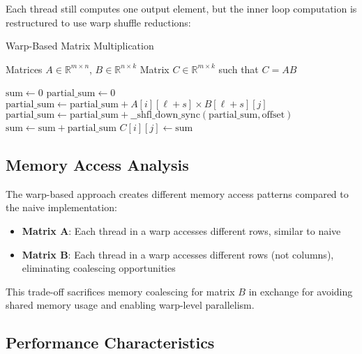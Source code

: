 \documentclass{amsbook}
\theoremstyle{definition}
\begin{document}
Each thread still computes one output element, but the inner loop computation is restructured to use warp shuffle reductions:

\begin{algorithm}
\caption{Warp-Based Matrix Multiplication}
\begin{algorithmic}[1]
\Require Matrices $A \in \mathbb{R}^{m \times n}$, $B \in \mathbb{R}^{n \times k}$
\Ensure Matrix $C \in \mathbb{R}^{m \times k}$ such that $C = AB$

    \State $\text{sum} \leftarrow 0$
        \State $\text{partial\_sum} \leftarrow 0$
            \State $\text{partial\_sum} \leftarrow \text{partial\_sum} + A[i][\ell+s] \times B[\ell+s][j]$
        \EndFor
            \State $\text{partial\_sum} \leftarrow \text{partial\_sum} + \text{\_\_shfl\_down\_sync}(\text{partial\_sum}, \text{offset})$
        \EndFor
            \State $\text{sum} \leftarrow \text{sum} + \text{partial\_sum}$
        \EndIf
    \EndFor
    \State $C[i][j] \leftarrow \text{sum}$
\EndFor
\end{algorithmic}
\end{algorithm}

\subsection{Memory Access Analysis}

The warp-based approach creates different memory access patterns compared to the naive implementation:

\begin{itemize}
\item \textbf{Matrix A}: Each thread in a warp accesses different rows, similar to naive
\item \textbf{Matrix B}: Each thread in a warp accesses different rows (not columns), eliminating coalescing opportunities
\end{itemize}

This trade-off sacrifices memory coalescing for matrix $B$ in exchange for avoiding shared memory usage and enabling warp-level parallelism.

\subsection{Performance Characteristics}
\end{document}
